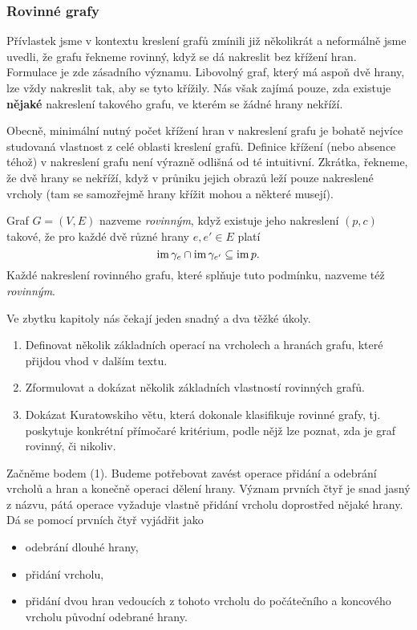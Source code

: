 \subsubsection{Rovinné grafy}
\label{sssec:rovinne-grafy}

Přívlastek  jsme v kontextu kreslení grafů zmínili již několikrát a
neformálně jsme uvedli, že grafu řekneme rovinný, když se dá nakreslit bez
křížení hran. Formulace  je zde zásadního významu. Libovolný
graf, který má aspoň dvě hrany, lze vždy nakreslit tak, aby se tyto křížily. Nás
však zajímá pouze, zda existuje \textbf{nějaké} nakreslení takového grafu, ve
kterém se žádné hrany nekříží.

Obecně, minimální nutný počet křížení hran v nakreslení grafu je bohatě nejvíce
studovaná vlastnost z celé oblasti kreslení grafů. Definice křížení (nebo
absence téhož) v nakreslení grafu není výrazně odlišná od té intuitivní.
Zkrátka, řekneme, že dvě hrany se nekříží, když v průniku jejich obrazů leží
pouze nakreslené vrcholy (tam se samozřejmě hrany křížit mohou a některé
musejí).

\begin{definition}
 \label{def:rovinny-graf}
 Graf $G = (V,E)$ nazveme \emph{rovinným}, když existuje jeho nakreslení $(p,c)$
 takové, že pro každé dvě různé hrany $e,e' \in E$ platí
 \[
  \operatorname{im} \gamma_e \cap \operatorname{im} \gamma_{e'} \subseteq \operatorname{im} p.
 \]
 Každé nakreslení rovinného grafu, které splňuje tuto podmínku, nazveme též
 \emph{rovinným}.
\end{definition}

Ve zbytku kapitoly nás čekají jeden snadný a dva těžké úkoly.
\begin{enumerate}
 \item Definovat několik základních operací na vrcholech a hranách grafu, které
  přijdou vhod v dalším textu.
 \item Zformulovat a dokázat několik základních vlastností rovinných gra\-fů.
 \item Dokázat Kuratowskiho větu, která dokonale klasifikuje rovinné gra\-fy,
  tj. poskytuje konkrétní přímočaré kritérium, podle nějž lze poznat, zda je
  graf rovinný, či nikoliv.
\end{enumerate}

Začněme bodem (1). Budeme potřebovat zavést operace přidání a odebrání vrcholů a
hran a konečně operaci dělení hrany. Význam prvních čtyř je snad jasný z názvu,
pátá operace vyžaduje vlastně přidání vrcholu doprostřed nějaké hrany. Dá se
pomocí prvních čtyř vyjádřit jako
\begin{itemize}
 \item odebrání dlouhé hrany,
 \item přidání vrcholu,
 \item přidání dvou hran vedoucích z tohoto vrcholu do počátečního a koncového
  vrcholu původní odebrané hrany.
\end{itemize}

